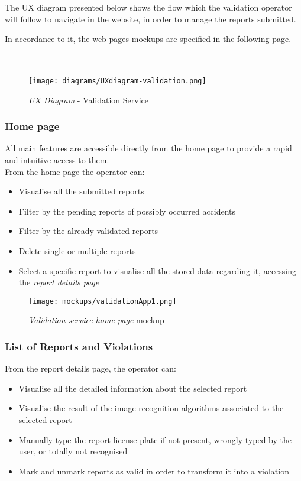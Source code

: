 The UX diagram presented below shows the flow which the validation operator will follow to navigate in the website, in order to manage the reports submitted.

In accordance to it, the web pages mockups are specified in the following page.\\\\\\

\begin{figure}[ht!]
	\centering
	\texttt{[image: diagrams/UXdiagram-validation.png]}
	\caption{
		\label{fig:uxvalidation} 
		\emph{UX Diagram} - Validation Service
	}
\end{figure}

\clearpage
\subsubsection{Home page}
All main features are accessible directly from the home page to provide a rapid and intuitive access to them. \\
From the home page the operator can:
\begin{itemize}
	\item Visualise all the submitted reports
	\item Filter by the pending reports of possibly occurred accidents
	\item Filter by the already validated reports
	\item Delete single or multiple reports
	\item Select a specific report to visualise all the stored data regarding it, accessing the \emph{report details page}\newline\newline
\end{itemize}
 
 \begin{figure}[ht!]
 	\hspace*{-1cm}
			\centering
			\texttt{[image: mockups/validationApp1.png]}
			\caption{
				\label{fig:cc1} 
				\emph{Validation service home page} mockup
			}
		\end{figure}

		\clearpage
\subsubsection{List of Reports and Violations}

From the report details page, the operator can:
\begin{itemize}
	\item Visualise all the detailed information about the selected report
	\item Visualise the result of the image recognition algorithms associated to the selected report
	\item Manually type the report license plate if not present, wrongly typed by the user, or totally not recognised
	\item Mark and unmark reports as valid in order to transform it into a violation\newline\newline
\end{itemize}

